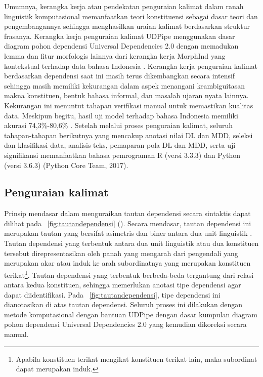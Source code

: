 Umumnya, kerangka kerja atau pendekatan penguraian kalimat dalam ranah linguistik komputasional memanfaatkan teori konstituensi sebagai dasar teori dan pengembangannya sehingga menghasilkan uraian kalimat berdasarkan struktur frasanya. Kerangka kerja penguraian kalimat UDPipe menggunakan dasar diagram pohon dependensi Universal Dependencies 2.0 \citep{nivre2017universal} dengan memadukan lemma dan fitur morfologis lainnya dari kerangka kerja MorphInd yang kontekstual terhadap data bahasa Indonesia \citep{larasati2011indonesian}. Kerangka kerja penguraian kalimat berdasarkan dependensi saat ini masih terus dikembangkan secara intensif sehingga masih memiliki kekurangan dalam aspek menangani keambiguitasan makna konstituen, bentuk bahasa informal, dan masalah ujaran nyata lainnya. Kekurangan ini menuntut tahapan verifikasi manual untuk memastikan kualitas data. Meskipun begitu, hasil uji model terhadap bahasa Indonesia memiliki akurasi 74,3\%-80,6\% \citep{udpipe2017}. Setelah melalui proses penguraian kalimat, seluruh tahapan-tahapan berikutnya yang mencakup anotasi nilai DL dan MDD, seleksi dan klasifikasi data, analisis teks, pemaparan pola DL dan MDD, serta uji signifikansi memanfaatkan bahasa pemrograman R (versi 3.3.3) \citep{r2017project} dan Python (versi 3.6.3) (Python Core Team, 2017).

\subsection{Penguraian kalimat}
Prinsip mendasar dalam menguraikan tautan dependensi secara sintaktis dapat dilihat pada \pic~\ref{fig:tautandependensi} (\citealp{tesniere1959elements, hudson1984word, liu2008dependency, liu2017dependency}). Secara mendasar, tautan dependensi ini merupakan tautan yang bersifat asimetris dan biner antara dua unit linguistik \citep{tesniere1959elements}. Tautan dependensi yang terbentuk antara dua unit linguistik atau dua konstituen tersebut direpresentasikan oleh panah yang mengarah dari pengendali yang merupakan akar atau induk ke arah subordinatnya yang merupakan konstituen terikat\footnote{Apabila konstituen terikat mengikat konstituen terikat lain, maka subordinat dapat merupakan induk.}. Tautan dependensi yang terbentuk berbeda-beda tergantung dari relasi antara kedua konstituen, sehingga memerlukan anotasi tipe dependensi agar dapat diidentifikasi. Pada \pic~\ref{fig:tautandependensi}, tipe dependensi ini dianotasikan di atas tautan dependensi. Seluruh proses ini dilakukan dengan metode komputasional dengan bantuan UDPipe \citep{udpipe2017} dengan dasar kumpulan diagram pohon dependensi Universal Dependencies 2.0 \citep{nivre2017universal} yang kemudian dikoreksi secara manual.

